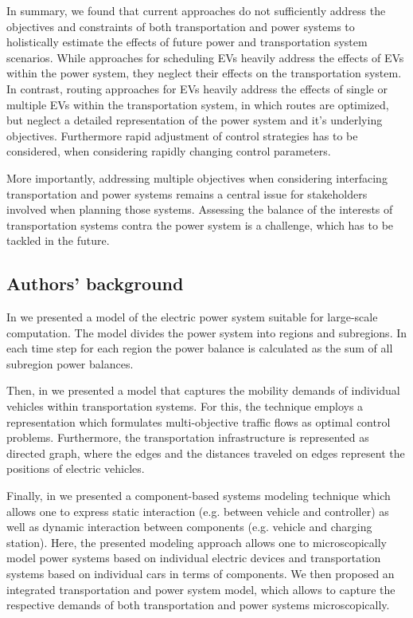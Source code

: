 In summary, we found that current approaches do not sufficiently address the objectives and constraints of both transportation and power systems to holistically estimate the effects of future power and transportation system scenarios. While approaches for scheduling EVs heavily address the effects of EVs within the power system, they neglect their effects on the transportation system. In contrast, routing approaches for EVs heavily address the effects of single or multiple EVs within the transportation system, in which routes are optimized, but neglect a detailed representation of the power system and it's underlying objectives. Furthermore rapid adjustment of control strategies has to be considered, when considering rapidly changing control parameters.

More importantly, addressing multiple objectives when considering interfacing transportation and power systems remains a central issue for stakeholders involved when planning those systems. Assessing the balance of the interests of transportation systems contra the power system is a challenge, which has to be tackled in the future.

\subsection{Authors' background}
\label{backgrounds}

In \cite{Hackenberg2012} we presented a model of the electric power system suitable for large-scale computation. The model divides the power system into regions and subregions. In each time step for each region the power balance is calculated as the sum of all subregion power balances.

Then, in \cite{ascher2014early} we presented a model that captures the mobility demands of individual vehicles within transportation systems. For this, the technique employs a representation which formulates multi-objective traffic flows as optimal control problems. Furthermore, the transportation infrastructure is represented as directed graph, where the edges and the distances traveled on edges represent the positions of electric vehicles.

Finally, in \cite{ascher2015integrated} we presented a component-based systems modeling technique which allows one to express static interaction (e.g. between vehicle and controller) as well as dynamic interaction between components (e.g. vehicle and charging station). Here, the presented modeling approach allows one to microscopically model power systems based on individual electric devices and transportation systems based on individual cars in terms of components. We then proposed an integrated transportation and power system model, which allows to capture the respective demands of both transportation and power systems microscopically.

